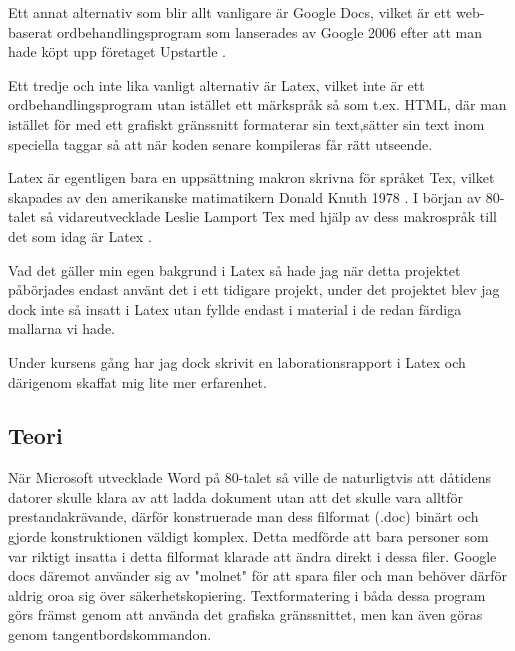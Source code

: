 Ett annat alternativ som blir allt vanligare är Google Docs, vilket är ett web-baserat ordbehandlingsprogram som lanserades av Google 2006 \cite{docs_launch} efter att man hade köpt upp företaget Upstartle \cite{upstartle}.

Ett tredje och inte lika vanligt alternativ är Latex, vilket inte är ett ordbehandlingsprogram utan istället ett märkspråk
 så som t.ex. HTML, där man istället för med ett grafiskt gränssnitt formaterar sin text,sätter sin text inom speciella taggar så att när koden senare kompileras får rätt utseende.

Latex är egentligen bara en uppsättning makron skrivna för språket Tex, vilket skapades av den amerikanske matimatikern Donald Knuth 1978 \cite{donald_knuth}. I början av 80-talet så vidareutvecklade Leslie Lamport Tex med hjälp av dess makrospråk till det som 
idag är Latex \cite{leslie_lamport}.

Vad det gäller min egen bakgrund i Latex så hade jag när detta projektet påbörjades endast använt det i ett tidigare projekt, under det projektet
blev jag dock inte så insatt i Latex utan fyllde endast i material i de redan färdiga mallarna vi hade.

Under kursens gång har jag dock skrivit en laborationsrapport i Latex och därigenom skaffat mig lite mer erfarenhet.


\subsection{Teori}
När Microsoft utvecklade Word på 80-talet så ville de naturligtvis att dåtidens datorer skulle klara av att ladda 
dokument utan att det skulle vara alltför prestandakrävande, därför konstruerade man dess filformat (.doc) binärt och gjorde konstruktionen 
väldigt komplex. Detta medförde att bara personer som var riktigt insatta i detta filformat klarade att ändra direkt i dessa filer. Google docs däremot använder sig av "molnet" för att spara filer och man behöver därför aldrig oroa sig över säkerhetskopiering. Textformatering i båda dessa program görs främst genom att använda det grafiska gränssnittet, men kan även göras genom tangentbordskommandon.

